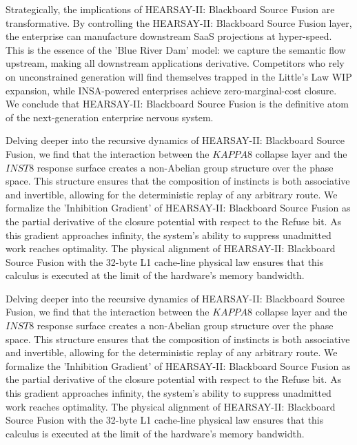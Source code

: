 \documentclass[12pt,a4paper,oneside]{book}
\begin{document}
Strategically, the implications of HEARSAY-II: Blackboard Source Fusion are transformative. By controlling the HEARSAY-II: Blackboard Source Fusion layer, the enterprise can manufacture downstream SaaS projections at hyper-speed. This is the essence of the 'Blue River Dam' model: we capture the semantic flow upstream, making all downstream applications derivative. Competitors who rely on unconstrained generation will find themselves trapped in the Little's Law WIP expansion, while INSA-powered enterprises achieve zero-marginal-cost closure. We conclude that HEARSAY-II: Blackboard Source Fusion is the definitive atom of the next-generation enterprise nervous system. 

Delving deeper into the recursive dynamics of HEARSAY-II: Blackboard Source Fusion, we find that the interaction between the $KAPPA8$ collapse layer and the $INST8$ response surface creates a non-Abelian group structure over the phase space. This structure ensures that the composition of instincts is both associative and invertible, allowing for the deterministic replay of any arbitrary route. We formalize the 'Inhibition Gradient' of HEARSAY-II: Blackboard Source Fusion as the partial derivative of the closure potential with respect to the Refuse bit. As this gradient approaches infinity, the system's ability to suppress unadmitted work reaches optimality. The physical alignment of HEARSAY-II: Blackboard Source Fusion with the 32-byte L1 cache-line physical law ensures that this calculus is executed at the limit of the hardware's memory bandwidth. 

Delving deeper into the recursive dynamics of HEARSAY-II: Blackboard Source Fusion, we find that the interaction between the $KAPPA8$ collapse layer and the $INST8$ response surface creates a non-Abelian group structure over the phase space. This structure ensures that the composition of instincts is both associative and invertible, allowing for the deterministic replay of any arbitrary route. We formalize the 'Inhibition Gradient' of HEARSAY-II: Blackboard Source Fusion as the partial derivative of the closure potential with respect to the Refuse bit. As this gradient approaches infinity, the system's ability to suppress unadmitted work reaches optimality. The physical alignment of HEARSAY-II: Blackboard Source Fusion with the 32-byte L1 cache-line physical law ensures that this calculus is executed at the limit of the hardware's memory bandwidth. 
\end{document}
